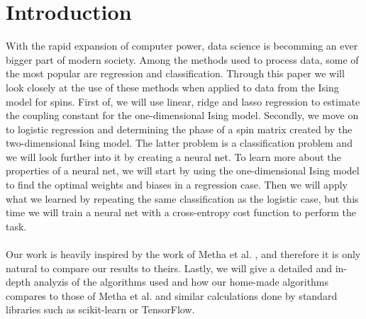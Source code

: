 
\section{Introduction}
With the rapid expansion of computer power, data science is becomming an ever bigger part of modern society. Among the methods used to process data, some of the most popular are regression and classification. Through this paper we will look closely at the use of these methods when applied to data from the Ising model for spins. First of, we will use linear, ridge and lasso regression to estimate the coupling constant for the one-dimensional Ising model. Secondly, we move on to logistic regression and determining the phase of a spin matrix created by the two-dimensional Ising model. The latter problem is a classification problem and we will look further into it by creating a neural net. To learn more about the properties of a neural net, we will start by using the one-dimensional Ising model to find the optimal weights and biases in a regression case. Then we will apply what we learned by repeating the same classification as the logistic case, but this time we will train a neural net with a cross-entropy cost function to perform the task.  \\ \\
Our work is heavily inspired by the work of Metha et al. \cite{2018arXiv180308823M}, and therefore it is only natural to compare our results to theirs. Lastly, we will give a detailed and in-depth analyzis of the algorithms used and how our home-made algorithms compares to those of Metha et al. and similar calculations done by standard libraries such as scikit-learn or TensorFlow.